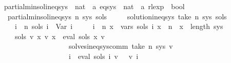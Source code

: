 \begin{isabellebody}
\isamarkupfalse%
\ partial{\isacharunderscore}{\kern0pt}min{\isacharunderscore}{\kern0pt}sol{\isacharunderscore}{\kern0pt}ineq{\isacharunderscore}{\kern0pt}sys\ {\isacharcolon}{\kern0pt}{\isacharcolon}{\kern0pt}\ {\isachardoublequoteopen}nat\ {\isasymRightarrow}\ {\isacharprime}{\kern0pt}a\ eq{\isacharunderscore}{\kern0pt}sys\ {\isasymRightarrow}\ {\isacharparenleft}{\kern0pt}nat\ {\isasymRightarrow}\ {\isacharprime}{\kern0pt}a\ rlexp{\isacharparenright}{\kern0pt}\ {\isasymRightarrow}\ bool{\isachardoublequoteclose}\ \isanewline
\ \ {\isachardoublequoteopen}partial{\isacharunderscore}{\kern0pt}min{\isacharunderscore}{\kern0pt}sol{\isacharunderscore}{\kern0pt}ineq{\isacharunderscore}{\kern0pt}sys\ n\ sys\ sols\ {\isasymequiv}\isanewline
\ \ \ \ solution{\isacharunderscore}{\kern0pt}ineq{\isacharunderscore}{\kern0pt}sys\ {\isacharparenleft}{\kern0pt}take\ n\ sys{\isacharparenright}{\kern0pt}\ sols\ {\isasymand}\isanewline
\ \ \ \ {\isacharparenleft}{\kern0pt}{\isasymforall}i\ {\isasymge}\ n{\isachardot}{\kern0pt}\ sols\ i\ {\isacharequal}{\kern0pt}\ Var\ i{\isacharparenright}{\kern0pt}\ {\isasymand}\isanewline
\ \ \ \ {\isacharparenleft}{\kern0pt}{\isasymforall}i\ {\isacharless}{\kern0pt}\ n{\isachardot}{\kern0pt}\ {\isasymforall}x\ {\isasymin}\ vars\ {\isacharparenleft}{\kern0pt}sols\ i{\isacharparenright}{\kern0pt}{\isachardot}{\kern0pt}\ x\ {\isasymge}\ n\ {\isasymand}\ x\ {\isacharless}{\kern0pt}\ length\ sys{\isacharparenright}{\kern0pt}\ {\isasymand}\isanewline
\ \ \ \ {\isacharparenleft}{\kern0pt}{\isasymforall}sols{\isacharprime}{\kern0pt}\ v{\isacharprime}{\kern0pt}{\isachardot}{\kern0pt}\ {\isacharparenleft}{\kern0pt}{\isasymforall}x{\isachardot}{\kern0pt}\ v{\isacharprime}{\kern0pt}\ x\ {\isacharequal}{\kern0pt}\ eval\ {\isacharparenleft}{\kern0pt}sols{\isacharprime}{\kern0pt}\ x{\isacharparenright}{\kern0pt}\ v{\isacharprime}{\kern0pt}{\isacharparenright}{\kern0pt}\isanewline
\ \ \ \ \ \ \ \ \ \ \ \ \ \ \ \ \ \ {\isasymand}\ solves{\isacharunderscore}{\kern0pt}ineq{\isacharunderscore}{\kern0pt}sys{\isacharunderscore}{\kern0pt}comm\ {\isacharparenleft}{\kern0pt}take\ n\ sys{\isacharparenright}{\kern0pt}\ v{\isacharprime}{\kern0pt}\isanewline
\ \ \ \ \ \ \ \ \ \ \ \ \ \ \ \ \ \ {\isasymlongrightarrow}\ {\isacharparenleft}{\kern0pt}{\isasymforall}i{\isachardot}{\kern0pt}\ {\isasymPsi}\ {\isacharparenleft}{\kern0pt}eval\ {\isacharparenleft}{\kern0pt}sols\ i{\isacharparenright}{\kern0pt}\ v{\isacharprime}{\kern0pt}{\isacharparenright}{\kern0pt}\ {\isasymsubseteq}\ {\isasymPsi}\ {\isacharparenleft}{\kern0pt}v{\isacharprime}{\kern0pt}\ i{\isacharparenright}{\kern0pt}{\isacharparenright}{\kern0pt}{\isacharparenright}{\kern0pt}{\isachardoublequoteclose}%

\end{isabellebody}

